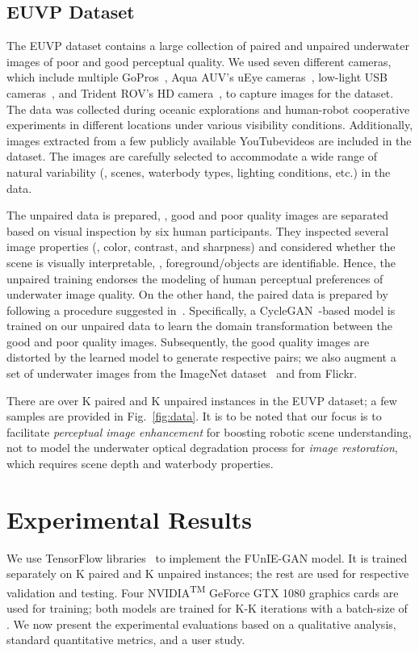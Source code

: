 \documentclass[10pt,twocolumn,letterpaper]{article}
\begin{document}
\subsection{EUVP Dataset}
The EUVP dataset contains a large collection of paired and unpaired underwater images of poor and good perceptual quality. We used seven different cameras, which include multiple GoPros~\cite{gopro}, Aqua AUV's uEye cameras~\cite{dudek2007aqua}, low-light USB cameras~\cite{lowlight}, and Trident ROV's HD camera~\cite{trident}, to capture images for the dataset. The data was collected during oceanic explorations and human-robot cooperative experiments in different locations under various visibility conditions. Additionally, images extracted from a few publicly available YouTube\texttrademark videos are included in the dataset. 
The images are carefully selected to accommodate a wide range of natural variability (\eg, scenes, waterbody types, lighting conditions, etc.) in the data.    
 

The unpaired data is prepared, \ie, good and poor quality images are separated based on visual inspection by six human participants. They inspected several image properties (\eg, color, contrast, and sharpness) and considered whether the scene is visually interpretable, \ie, foreground/objects are identifiable. Hence, the unpaired training endorses the modeling of human perceptual preferences of underwater image quality. On the other hand, the paired data is prepared by following a procedure suggested in~\cite{fabbri2018enhancing}. Specifically, a CycleGAN~\cite{zhu2017unpaired}-based model is trained on our unpaired data to learn the domain transformation between the good and poor quality images. Subsequently, the good quality images are distorted by the learned model to generate respective pairs; we also augment a set of underwater images from the ImageNet dataset~\cite{deng2009imagenet} and from Flickr\texttrademark. 


There are over K paired and K unpaired instances in the EUVP dataset; a few samples are provided in Fig.~\ref{fig:data}. It is to be noted that our focus is to facilitate \textit{perceptual image enhancement} for boosting robotic scene understanding, not to model the underwater optical degradation process for \textit{image restoration}, which requires scene depth and waterbody properties.  
 \section{Experimental Results}
We use TensorFlow libraries~\cite{abadi2016tensorflow} to implement the FUnIE-GAN model. It is trained separately on K paired and K unpaired instances; the rest are used for respective validation and testing. Four NVIDIA\textsuperscript{TM} GeForce GTX 1080 graphics cards are used for training; both models are trained for K-K iterations with a batch-size of . We now present the experimental evaluations based on a qualitative analysis, standard quantitative metrics, and a user study.      
\end{document}
